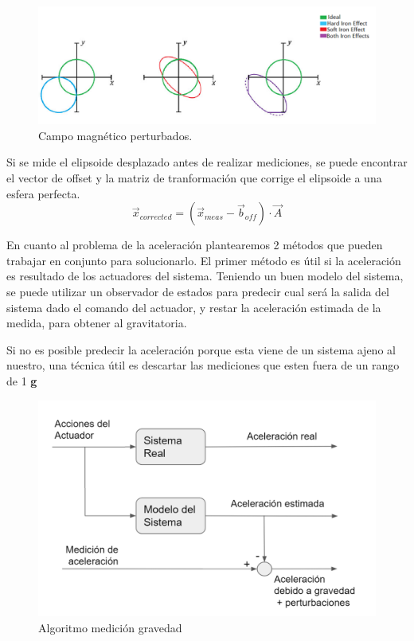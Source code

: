  \begin{figure}[H]
	\center
	\includegraphics[width=0.8\linewidth, page=1,]{Imagenes/efectos}
	\caption{Campo magnético perturbados.}
	\label{fig:Esq_con:efectos}
\end{figure}
Si se mide el elipsoide desplazado antes de realizar mediciones, se puede encontrar el vector de offset y la matriz de tranformaci\'on que corrige el elipsoide a una esfera perfecta.
\begin{equation}
\vec{x}_{corrected} = (\vec{x}_{meas}-\vec{b}_{off}) \cdot \vec{A} 
\end{equation}

En cuanto al problema de la aceleración plantearemos 2 métodos que pueden trabajar en conjunto para solucionarlo.
El primer método es útil si la aceleración es resultado de los actuadores del sistema. Teniendo un buen modelo del sistema, se puede utilizar un observador de estados para predecir cual será la salida del sistema dado el comando del actuador, y restar la aceleración estimada de la medida, para obtener al gravitatoria.


Si no es posible predecir la aceleración porque esta viene de un sistema ajeno al nuestro, una técnica útil es descartar las mediciones que esten fuera de un rango de 1 \textbf{g} 

 \begin{figure}[H]
	\center
	\includegraphics[width=0.8\linewidth, page=1,]{Imagenes/gravedadac}
	\caption{Algoritmo medici\'on gravedad}
	\label{fig:Esq_con:grav}
\end{figure}

